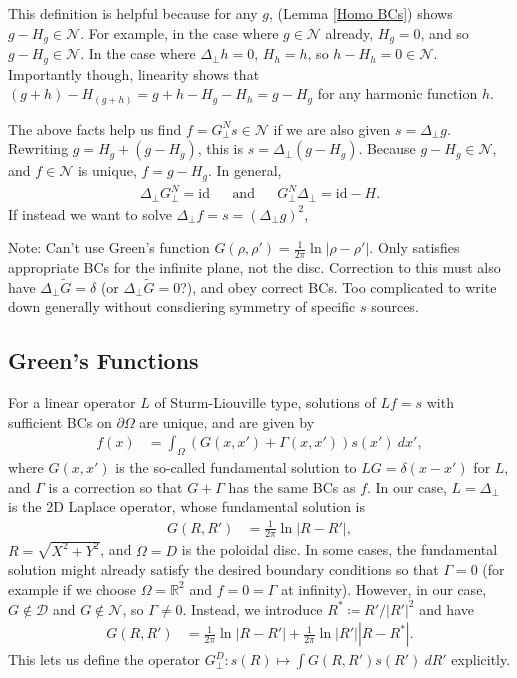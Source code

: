 \documentclass{article}
\newcommand{\lap}{\Delta_\perp}
\newcommand{\p}{\partial}
\newcommand{\til}[1]{\widetilde{ #1 }}
\newcommand{\GN}{G_\perp^N}
\newcommand{\GD}{G_\perp^D}
\newcommand{\pth} [1] {\left( #1 \right) }
\begin{document}
This definition is helpful because for any $g$, (Lemma \ref{Homo BCs}) shows $g-H_g\in\mathcal{N}$. 
For example, in the case where $g\in\mathcal{N}$ already, $H_g=0$, and so $g-H_g\in\mathcal{N}$. 
In the case where $\lap h=0$, $H_h=h$, so $h-H_h = 0\in\mathcal{N}$. 
Importantly though, linearity shows that $(g+h)-H_{(g+h)} = g+h-H_g-H_h = g-H_g$ for any harmonic function $h$. 

The above facts help us find $f=\GN s\in\mathcal{N}$ if we are also given $s=\lap g$. Rewriting $g=H_g+(g-H_g)$, this is $s=\lap(g-H_g)$. Because $g-H_g\in\mathcal{N}$, and $f\in\mathcal{N}$ is unique, $f=g-H_g$. In general, 
\begin{align*}
    \lap\GN = \text{id} && \text{and} && \GN\lap = \text{id}-H.
\end{align*}
If instead we want to solve $\lap f = s = \pth{\lap g}^2$, 

Note: Can't use Green's function $G(\rho, \rho') = \frac{1}{2\pi}\ln|\rho-\rho'|$. Only satisfies appropriate BCs for the infinite plane, not the disc. Correction to this must also have $\lap\til{G}=\delta$ (or $\lap\til{G}=0$?), and obey correct BCs. Too complicated to write down generally without consdiering symmetry of specific $s$ sources. 


\subsection{Green's Functions} \label{Green's}
For a linear operator $L$ of Sturm-Liouville type, solutions of $Lf=s$ with sufficient BCs on $\p\Omega$ are unique, and are given by 
\begin{align*}
    f(x) &= \int_\Omega (G(x,x') + \Gamma(x,x')) s(x')\ dx', 
\end{align*}
where $G(x,x')$ is the so-called fundamental solution to $LG=\delta(x-x')$ for $L$, and $\Gamma$ is a correction so that $G+\Gamma$ has the same BCs as $f$. %
In our case, $L=\lap$ is the 2D Laplace operator, whose fundamental solution is 
\begin{align*}
    G(R,R')&= \frac{1}{2\pi} \ln|R-R'|, 
\end{align*}
$R=\sqrt{X^2+Y^2}$, and $\Omega=D$ is the poloidal disc. In some cases, the fundamental solution might already satisfy the desired boundary conditions so that $\Gamma=0$ (for example if we choose $\Omega=\mathbb{R}^2$ and $f=0=\Gamma$ at infinity). However, in our case, $G\notin\mathcal{D}$ and $G\notin\mathcal{N}$, so $\Gamma\neq 0$. Instead, we introduce $R^* \coloneq R'/|R'|^2$ and have  
\begin{align*}
    G(R,R') &= \frac{1}{2\pi} \ln|R-R'| + \frac{1}{2\pi} \ln|R'||R-R^*|. 
\end{align*}
This lets us define the operator $\GD:s(R) \mapsto \int G(R,R') s(R')\ dR'$ explicitly. 
\end{document}
